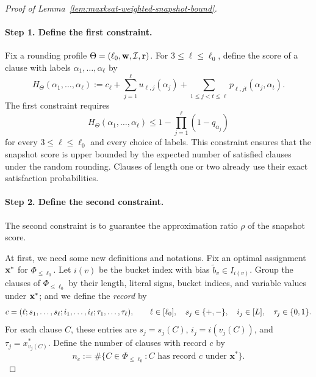 \begin{proof}[Proof of Lemma~\ref{lem:maxksat-weighted-snapshot-bound}]
\leavevmode\par
\paragraph{Step 1. Define the first constraint.}
Fix a rounding profile $\Theta = (\ell_0,\mathbf{w},\mathcal{I},\mathbf{r})$. For $3\le\ell\le\ell_0$, define the score of a clause with labels $\alpha_1,\ldots,\alpha_\ell$ by
\[
  H_\Theta(\alpha_1,\ldots,\alpha_\ell)
  :=c_\ell+\sum_{j=1}^\ell u_{\ell,j}(\alpha_j)
    +\sum_{1\le j<t\le\ell}p_{\ell,jt}(\alpha_j,\alpha_t).
\]
The first constraint requires
\begin{equation}
  H_\Theta(\alpha_1,\ldots,\alpha_\ell)
  \le1-\prod_{j=1}^\ell(1-q_{\alpha_j})
  \label{eq:snapshot-score-upper}
\end{equation}
for every $3\le\ell\le\ell_0$ and every choice of labels.
This constraint ensures that the snapshot score is upper bounded by  the expected number of satisfied clauses under the random rounding. 
Clauses of length one or two already use their exact satisfaction probabilities.


\paragraph{Step 2. Define the second constraint.}
The second constraint is to  guarantee the approximation ratio $\rho$ of  the snapshot score. 



At first, we need some new definitions and notations. 
Fix an optimal assignment $\mathbf{x}^*$ for $\Phi_{\le\ell_0}$. Let $i(v)$ be the bucket index with bias $\widetilde b_v\in I_{i(v)}$. Group the clauses of $\Phi_{\le\ell_0}$ by their length, literal signs, bucket indices, and variable values under $\mathbf{x}^*$; and we define the \textit{record} by 
\[
  c=(\ell;s_1,\ldots,s_\ell;i_1,\ldots,i_\ell;\tau_1,\ldots,\tau_\ell),
  \qquad \ell\in[\ell_0],\quad s_j\in\{+,-\},\quad i_j\in[L],\quad\tau_j\in\{0,1\}.
\]
For each clause $C$, these entries are $s_j=s_j(C)$, $i_j=i(v_j(C))$, and $\tau_j=x^*_{v_j(C)}$. Define the number of clauses with record $c$ by 
$$
n_c := \#\{C\in\Phi_{\le\ell_0}:C\text{ has record } c \text{ under } \mathbf{x}^*\}.
$$  






\end{proof}
